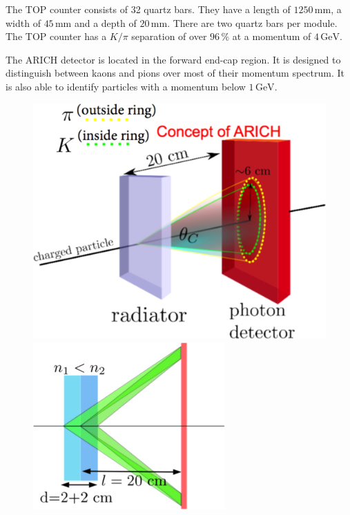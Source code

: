 \documentclass[a4paper,11pt,twosided,final,german,openbib,pdftex,listof=totoc,bibliography=totoc]{scrbook}
\begin{document}
The TOP counter consists of 32 quartz bars. They have a length of $1250\,\textrm{mm}$, a width of $45\,\textrm{mm}$ and a depth of $20\,\textrm{mm}$. There are two quartz bars per module. The TOP counter has a $K/\pi$ separation of over $96\,\%$ at a momentum of $4\,\textrm{GeV}$.\cite{B2TR}

The ARICH detector is located in the forward end-cap region. It is designed to distinguish between kaons and pions over most of their momentum spectrum. It is also able to identify particles with a momentum below $1\,\textrm{GeV}$.

\begin{figure}[h!]
	\centering
\begin{minipage}[b]{0.45\linewidth}
	\centering
	\includegraphics[width=\textwidth]{Bilder/ARICH}
\end{minipage}
\hspace{0.5cm}
\begin{minipage}[b]{0.45\linewidth}
	\centering
	\includegraphics[width=\textwidth]{Bilder/ARICH2}
\end{minipage}


\end{figure}
\end{document}
